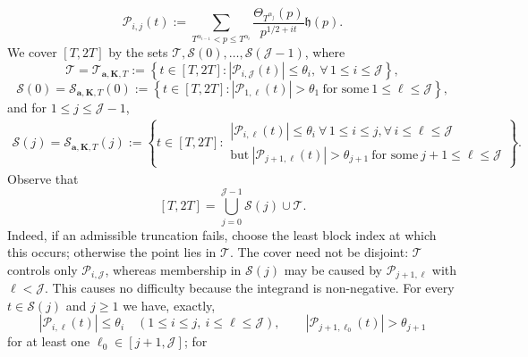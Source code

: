 \documentclass[twoside,reqno,11pt,a4paper]{amsart}
\numberwithin{equation}{section}
\theoremstyle{plain}
\theoremstyle{definition}
\theoremstyle{remark}
\renewcommand{\le}{\leqslant}
\renewcommand{\ge}{\geqslant}
\begin{document}
	\begin{equation}\label{def-pij}
		\mathcal{P}_{i,j}(t):= \sum_{T^{\alpha_{i-1}}< p \le  T^{\alpha_i}} \frac{\Theta_{T^{\alpha_j}}(p)}{p^{1/2+it}}\mathfrak{h}(p).
	\end{equation}
	We cover $[T,2T]$ by the sets $\mathcal{T},\mathcal{S}(0),\ldots,
    \mathcal{S}(\mathcal{J}-1)$, where
	\begin{equation*}
		\mathcal{T}= \mathcal{T}_{\mathbf{a},\mathbf K, T}:= \left\{ t\in [T,2T]: \left| \mathcal{P}_{i,\mathcal{J}}(t)\right|\le  \theta_i, \ \forall\, 1\le  i \le  \mathcal{J}\right\},
	\end{equation*}
	\begin{equation*}
		\mathcal{S}(0)= 	\mathcal{S}_{\mathbf{a},\mathbf K,T}(0):=\left\{ t\in [T,2T]: \left| \mathcal{P}_{1, \ell}(t)\right|> \theta_1 \ \text{for some}\ 1\le  \ell \le  \mathcal{J}\right\},
	\end{equation*}
	and
	for $1\le  j \le  \mathcal{J}-1$,
	\begin{align*}
		\mathcal{S}(j)=\mathcal{S}_{\mathbf{a},\mathbf K,T}(j):= \left\{ t\in[T,2T]: \begin{array}{l}
				\left| \mathcal{P}_{i,\ell}(t)\right|\le  \theta_i \ \forall\,1\le  i\le  j, \forall \, i\le \ell\le  \mathcal{J}\\
				\text{but}\ 	\left| \mathcal{P}_{j+1,\ell}(t)\right|> \theta_{j+1} \ \text{for some} \ j+1\le  \ell\le  \mathcal{J}
		\end{array}\right\}.
	\end{align*}
	Observe that 
	\begin{equation}\label{integral-splits}
		\left[T, 2T\right] =\bigcup_{j=0}^{\mathcal{J}-1}\mathcal{S}(j) \cup \mathcal{T}.
	\end{equation}
	Indeed, if an admissible truncation fails, choose the least block index at
	which this occurs; otherwise the point lies in $\mathcal T$.
	The cover need not be disjoint: $\mathcal T$ controls only
    $\mathcal P_{i,\mathcal J}$, whereas membership in $\mathcal S(j)$ may be
    caused by $\mathcal P_{j+1,\ell}$ with $\ell<\mathcal J$.  This causes no
    difficulty because the integrand is non-negative.  For every
    $t\in\mathcal S(j)$ and $j\ge1$ we have, exactly,
    \begin{equation*}
    |\mathcal P_{i,\ell}(t)|\le\theta_i
    \quad(1\le i\le j,\ i\le\ell\le\mathcal J),
    \qquad
    |\mathcal P_{j+1,\ell_0}(t)|>\theta_{j+1}
    \end{equation*}
    for at least one $\ell_0\in[j+1,\mathcal J]$; for
\end{document}
